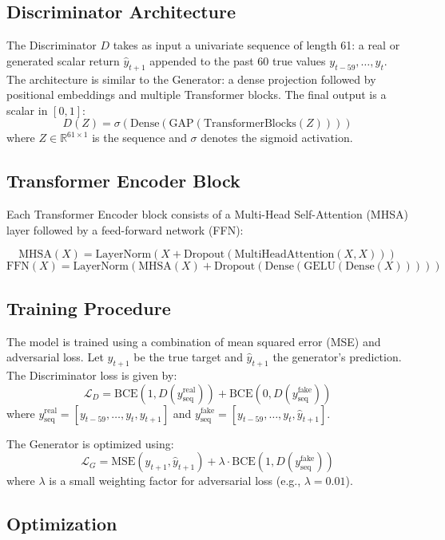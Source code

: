 \subsection{Discriminator Architecture}

The Discriminator $D$ takes as input a univariate sequence of length 61: a real or generated scalar return $\hat{y}_{t+1}$ appended to the past 60 true values $y_{t-59}, \dots, y_t$. The architecture is similar to the Generator: a dense projection followed by positional embeddings and multiple Transformer blocks. The final output is a scalar in $[0, 1]$:
\[
D(Z) = \sigma(\text{Dense}(\text{GAP}(\text{TransformerBlocks}(Z))))
\]
where $Z \in \mathbb{R}^{61 \times 1}$ is the sequence and $\sigma$ denotes the sigmoid activation.

\subsection{Transformer Encoder Block}

\begingroup
\sloppy
Each Transformer Encoder block consists of a Multi-Head Self-Attention (MHSA) layer followed by a feed-forward network (FFN):
\endgroup

\[
\text{MHSA}(X) = \text{LayerNorm}(X + \text{Dropout}(\text{MultiHeadAttention}(X, X)))
\]
\[
\text{FFN}(X) = \text{LayerNorm}(\text{MHSA}(X) + \text{Dropout}(\text{Dense}(\text{GELU}(\text{Dense}(X)))))
\]

\subsection{Training Procedure}

The model is trained using a combination of mean squared error (MSE) and adversarial loss. Let $y_{t+1}$ be the true target and $\hat{y}_{t+1}$ the generator's prediction. The Discriminator loss is given by:
\[
\mathcal{L}_D = \text{BCE}(1, D(y_{\text{seq}}^{\text{real}})) + \text{BCE}(0, D(y_{\text{seq}}^{\text{fake}}))
\]
where $y_{\text{seq}}^{\text{real}} = [y_{t-59}, \dots, y_t, y_{t+1}]$ and $y_{\text{seq}}^{\text{fake}} = [y_{t-59}, \dots, y_t, \hat{y}_{t+1}]$.

The Generator is optimized using:
\[
\mathcal{L}_G = \text{MSE}(y_{t+1}, \hat{y}_{t+1}) + \lambda \cdot \text{BCE}(1, D(y_{\text{seq}}^{\text{fake}}))
\]
where $\lambda$ is a small weighting factor for adversarial loss (e.g., $\lambda = 0.01$).

\subsection{Optimization}

